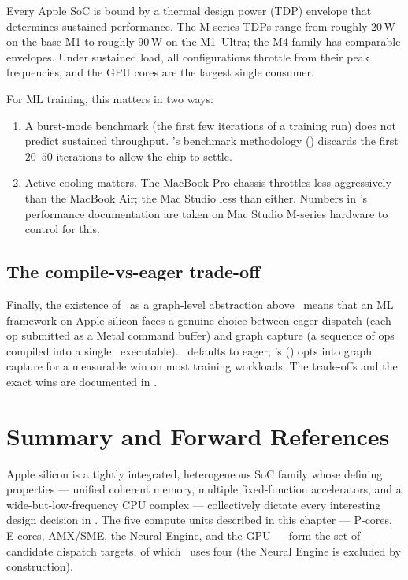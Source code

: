 Every Apple SoC is bound by a thermal design power (TDP) envelope
that determines sustained performance. The M-series TDPs range from
roughly $20$\,W on the base M1 to roughly $90$\,W on the M1~Ultra;
the M4 family has comparable envelopes. Under sustained load, all
configurations throttle from their peak frequencies, and the GPU
cores are the largest single consumer.

For ML training, this matters in two ways:
\begin{enumerate}
  \item A burst-mode benchmark (the first few iterations of a
    training run) does not predict sustained throughput. \Lucid's
    benchmark methodology () discards
    the first $20$--$50$ iterations to allow the chip to settle.
  \item Active cooling matters. The MacBook Pro chassis throttles
    less aggressively than the MacBook Air; the Mac Studio less than
    either. Numbers in \Lucid's performance documentation are taken
    on Mac Studio M-series hardware to control for this.
\end{enumerate}

\subsection{The compile-vs-eager trade-off}
\label{ssec:apple_silicon:ml_compile}

Finally, the existence of \MPSGraph\ as a graph-level abstraction
above \Metal\ means that an ML framework on Apple silicon faces a
genuine choice between eager dispatch (each op submitted as a Metal
command buffer) and graph capture (a sequence of ops compiled into a
single \MPSGraph\ executable). \MLX\ defaults to eager; \Lucid's
 () opts into graph
capture for a measurable win on most training workloads. The
trade-offs and the exact wins are documented in
.

\section{Summary and Forward References}
\label{sec:apple_silicon:summary}

Apple silicon is a tightly integrated, heterogeneous SoC family whose
defining properties --- unified coherent memory, multiple
fixed-function accelerators, and a wide-but-low-frequency CPU complex
--- collectively dictate every interesting design decision in
\Lucid. The five compute units described in this chapter --- P-cores,
E-cores, AMX/SME, the Neural Engine, and the GPU --- form the set of
candidate dispatch targets, of which \Lucid\ uses four (the Neural
Engine is excluded by construction).

